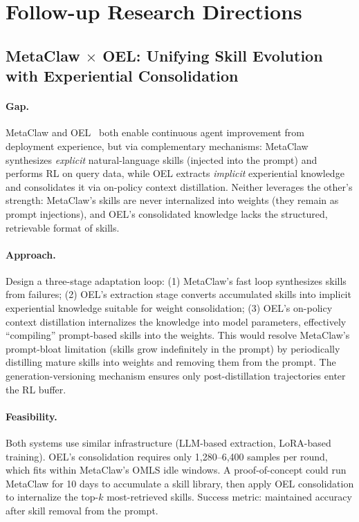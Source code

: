 \documentclass[11pt]{article}
\begin{document}
\section{Follow-up Research Directions}

\subsection{MetaClaw $\times$ OEL: Unifying Skill Evolution with Experiential Consolidation}

\paragraph{Gap.}
MetaClaw and OEL~\cite{oel} both enable continuous agent improvement from deployment experience, but via complementary mechanisms: MetaClaw synthesizes \emph{explicit} natural-language skills (injected into the prompt) and performs RL on query data, while OEL extracts \emph{implicit} experiential knowledge and consolidates it via on-policy context distillation.
Neither leverages the other's strength: MetaClaw's skills are never internalized into weights (they remain as prompt injections), and OEL's consolidated knowledge lacks the structured, retrievable format of skills.

\paragraph{Approach.}
Design a three-stage adaptation loop:
(1) MetaClaw's fast loop synthesizes skills from failures;
(2) OEL's extraction stage converts accumulated skills into implicit experiential knowledge suitable for weight consolidation;
(3) OEL's on-policy context distillation internalizes the knowledge into model parameters, effectively ``compiling'' prompt-based skills into the weights.
This would resolve MetaClaw's prompt-bloat limitation (skills grow indefinitely in the prompt) by periodically distilling mature skills into weights and removing them from the prompt.
The generation-versioning mechanism ensures only post-distillation trajectories enter the RL buffer.

\paragraph{Feasibility.}
Both systems use similar infrastructure (LLM-based extraction, LoRA-based training).
OEL's consolidation requires only 1,280--6,400 samples per round, which fits within MetaClaw's OMLS idle windows.
A proof-of-concept could run MetaClaw for 10 days to accumulate a skill library, then apply OEL consolidation to internalize the top-$k$ most-retrieved skills.
Success metric: maintained accuracy after skill removal from the prompt.
\end{document}
